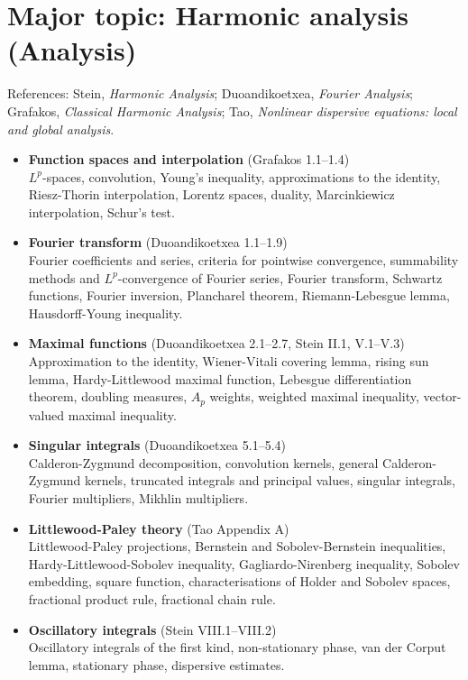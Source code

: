 \documentclass[11pt]{article}
\begin{document}
\section{Major topic:  Harmonic analysis (Analysis)}

References: Stein, \textit{Harmonic Analysis}; Duoandikoetxea, \textit{Fourier Analysis}; Grafakos, \textit{Classical Harmonic Analysis}; Tao, \textit{Nonlinear dispersive equations: local and global analysis}.
\begin{itemize}
\item \textbf{Function spaces and interpolation} (Grafakos 1.1--1.4)\\
$L^p$-spaces, convolution, Young's inequality, approximations to the identity, Riesz-Thorin interpolation, Lorentz spaces, duality, Marcinkiewicz interpolation, Schur's test.

\item \textbf{Fourier transform} (Duoandikoetxea 1.1--1.9)\\
Fourier coefficients and series,
criteria for pointwise convergence, summability methods and $L^p$-convergence of Fourier series, Fourier transform, Schwartz functions, Fourier inversion, Plancharel theorem, Riemann-Lebesgue lemma, Hausdorff-Young inequality. 

\item \textbf{Maximal functions} (Duoandikoetxea 2.1--2.7, Stein II.1, V.1--V.3) \\
Approximation to the identity, Wiener-Vitali covering lemma, rising sun lemma, Hardy-Littlewood maximal function, Lebesgue differentiation theorem, doubling measures, $A_p$ weights, weighted maximal inequality, vector-valued maximal inequality. 

\item \textbf{Singular integrals} (Duoandikoetxea 5.1--5.4) \\
Calderon-Zygmund decomposition, convolution kernels, general Calderon-Zygmund kernels, truncated integrals and principal values, singular integrals, Fourier multipliers, Mikhlin multipliers.

\item \textbf{Littlewood-Paley theory} (Tao Appendix A) \\
Littlewood-Paley projections, Bernstein and Sobolev-Bernstein inequalities, Hardy-Littlewood-Sobolev inequality, Gagliardo-Nirenberg inequality, Sobolev embedding, square function, characterisations of Holder and Sobolev spaces, fractional product rule, fractional chain rule. 

\item \textbf{Oscillatory integrals} (Stein VIII.1--VIII.2) \\
Oscillatory integrals of the first kind, non-stationary phase, van der Corput lemma, stationary phase, dispersive estimates.

\end{itemize}
\end{document}
